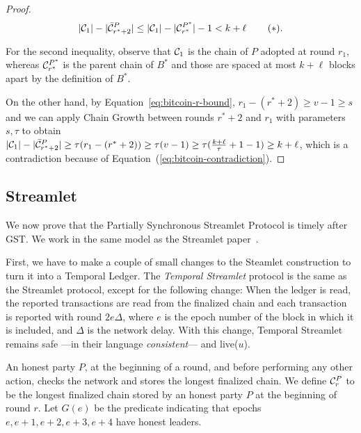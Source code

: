 \begin{proof}

  \[
     |\mathcal{C}_1| - |\bar {\mathcal{C}}^P_{r^* + 2}| \leq
     |\mathcal{C}_1| - |\mathcal{C}^{P^*}_{r^*}| - 1 <
     k + \ell\, \label{eq:bitcoin-contradiction}\tag{$\ast$}.
  \]

  For the second inequality, observe that
  $\mathcal{C}_1$ is the chain of $P$ adopted at round $r_1$,
  whereas $\mathcal{C}^{P^*}_{r^*}$ is
  the parent chain of $B^*$ and those are spaced at most $k + \ell$ blocks
  apart by the definition of $B^*$.

  On the other hand, by Equation~\ref{eq:bitcoin-r-bound}, $r_1 - (r^* + 2) \geq v - 1 \geq s$ and
  we can apply Chain Growth between rounds $r^* + 2$ and $r_1$
  with parameters $s, \tau$ to obtain
  $|\mathcal{C}_1| - |\bar {\mathcal{C}}^P_{r^* + 2}| \geq \tau(r_1 - (r^* + 2)) \geq \tau (v - 1) \geq
  \tau (\frac{k + \ell}{\tau} + 1 - 1) \geq k + \ell$,
  which is a contradiction because of Equation~(\ref{eq:bitcoin-contradiction}).

  \Qed
\end{proof}

\subsection{Streamlet}

We now prove that the Partially Synchronous Streamlet Protocol is timely
after GST.
We work in the same model as the Streamlet paper~\cite{streamlet}.

First, we have to make a couple of small changes to the Steamlet construction to turn it
into a Temporal Ledger.
The \emph{Temporal Streamlet} protocol is the same as the Streamlet protocol, except
for the following change: When the ledger is \textsf{read}, the reported transactions are
read from the finalized chain and each transaction is reported with round $2 e \Delta$,
where $e$ is the epoch number of the block in which it is included, and $\Delta$ is the
network delay.
With this change, Temporal Streamlet remains safe ---in their language \emph{consistent}--- and live($u$).

An honest party $P$, at the beginning of a round, and
before performing any other action, checks the network and
stores the longest finalized chain.
We define $\mathcal{C}^P_r$ to be the longest finalized chain stored by an honest
party $P$ at the beginning of round $r$.
Let $G(e)$ be the predicate indicating that epochs $e,e+1,e+2,e+3,e+4$ have honest leaders.

